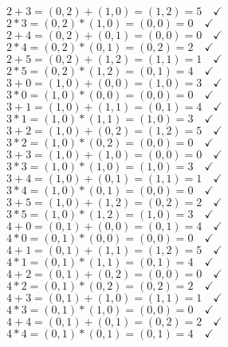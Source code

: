 \documentclass{article} %
\begin{document}
\begin{addmargin}[1em]{0em}
\begin{multicols}{2}
\\$2 + 3 = (0,2) + (1,0) = (1,2) = 5 \quad \checkmark$
\\$2 * 3 = (0,2) * (1,0) = (0,0) = 0 \quad \checkmark$
\\$2 + 4 = (0,2) + (0,1) = (0,0) = 0 \quad \checkmark$
\\$2 * 4 = (0,2) * (0,1) = (0,2) = 2 \quad \checkmark$
\\$2 + 5 = (0,2) + (1,2) = (1,1) = 1 \quad \checkmark$
\\$2 * 5 = (0,2) * (1,2) = (0,1) = 4 \quad \checkmark$
\\$3 + 0 = (1,0) + (0,0) = (1,0) = 3 \quad \checkmark$
\\$3 * 0 = (1,0) * (0,0) = (0,0) = 0 \quad \checkmark$
\\$3 + 1 = (1,0) + (1,1) = (0,1) = 4 \quad \checkmark$
\\$3 * 1 = (1,0) * (1,1) = (1,0) = 3 \quad \checkmark$
\\$3 + 2 = (1,0) + (0,2) = (1,2) = 5 \quad \checkmark$
\\$3 * 2 = (1,0) * (0,2) = (0,0) = 0 \quad \checkmark$
\\$3 + 3 = (1,0) + (1,0) = (0,0) = 0 \quad \checkmark$
\\$3 * 3 = (1,0) * (1,0) = (1,0) = 3 \quad \checkmark$
\\$3 + 4 = (1,0) + (0,1) = (1,1) = 1 \quad \checkmark$
\\$3 * 4 = (1,0) * (0,1) = (0,0) = 0 \quad \checkmark$
\\$3 + 5 = (1,0) + (1,2) = (0,2) = 2 \quad \checkmark$
\\$3 * 5 = (1,0) * (1,2) = (1,0) = 3 \quad \checkmark$
\\$4 + 0 = (0,1) + (0,0) = (0,1) = 4 \quad \checkmark$
\\$4 * 0 = (0,1) * (0,0) = (0,0) = 0 \quad \checkmark$
\\$4 + 1 = (0,1) + (1,1) = (1,2) = 5 \quad \checkmark$
\\$4 * 1 = (0,1) * (1,1) = (0,1) = 4 \quad \checkmark$
\\$4 + 2 = (0,1) + (0,2) = (0,0) = 0 \quad \checkmark$
\\$4 * 2 = (0,1) * (0,2) = (0,2) = 2 \quad \checkmark$
\\$4 + 3 = (0,1) + (1,0) = (1,1) = 1 \quad \checkmark$
\\$4 * 3 = (0,1) * (1,0) = (0,0) = 0 \quad \checkmark$
\\$4 + 4 = (0,1) + (0,1) = (0,2) = 2 \quad \checkmark$
\\$4 * 4 = (0,1) * (0,1) = (0,1) = 4 \quad \checkmark$

\end{multicols}
\end{addmargin}
\end{document}
